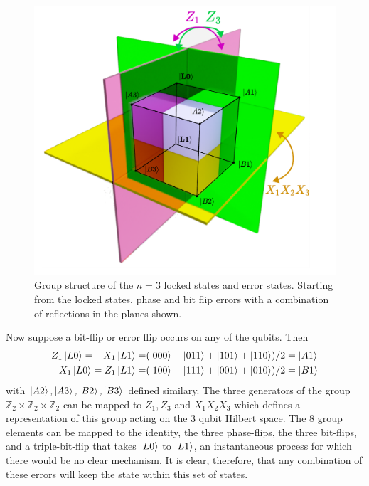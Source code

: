 \documentclass{report}
\begin{document}
\begin{appendices}
\begin{figure}[ht]
    \centering
    \includegraphics[scale = 0.6]{Figures/group/group.pdf}
    \caption{Group structure of the $n=3$ locked states and error states. Starting from the locked states, phase and bit flip errors with a combination of reflections in the planes shown.
    }\label{fig:group}
\end{figure}
Now suppose a bit-flip or error flip occurs on any of the qubits. Then 
\begin{align*}
    Z_1\ket{L0} = -X_1\ket{L1} = &(\ket{000} - \ket{011} + \ket{101} + \ket{110})/2 = \ket{A1}\\
    X_1\ket{L0} = Z_1\ket{L1} = &(\ket{100} - \ket{111} + \ket{001} + \ket{010})/2 = \ket{B1}
\end{align*} with $\ket{A2},\ket{A3},\ket{B2},\ket{B3}$ defined similary. The three generators of the group $\mathbb{Z}_2\times\mathbb{Z}_2\times\mathbb{Z}_2$ can be mapped to $Z_1, Z_3$ and $X_1X_2X_3$ which defines a representation of this group acting on the 3 qubit Hilbert space. The 8 group elements can be mapped to the identity, the three phase-flips, the three bit-flips, and a triple-bit-flip that takes $\ket{L0}$ to $\ket{L1}$, an instantaneous process for which there would be no clear mechanism. It is clear, therefore, that any combination of these errors will keep the state within this set of states.


\end{appendices}
\end{document}

